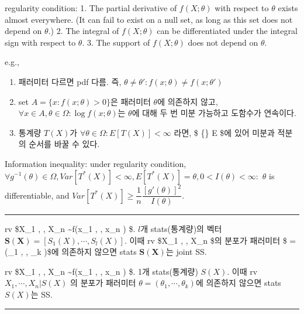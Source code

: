 \documentclass[
]{book}
\providecommand{\tightlist}{%
  \setlength{\itemsep}{0pt}\setlength{\parskip}{0pt}}
\begin{document}
regularity condition:
1. The partial derivative of \(f(X; \theta)\) with respect to \(\theta\) exists almost everywhere. (It can fail to exist on a null set, as long as this set does not depend on \(\theta\).)
2. The integral of \(f(X; \theta)\) can be differentiated under the integral sign with respect to \(\theta\).
3. The support of \(f(X; \theta)\) does not depend on \(\theta\).

e.g.,

\begin{enumerate}
\def\labelenumi{\arabic{enumi}.}
\tightlist
\item
  패러미터 다르면 pdf 다름. 즉, \(\theta \not = \theta': f(x;\theta) \not = f(x;\theta')\)
\item
  set \(A = \{ x: f(x;\theta)>0 \}\)은 패러미터 \(\theta\)에 의존하지 않고, \(\forall x \in A, \theta \in \Omega : \log f(x;\theta)\)는 \(\theta\)에 대해 두 번 미분 가능하고 도함수가 연속이다.
\item
  통계량 \(T(X)\)가 \(\forall \theta \in \Omega: E \left [ T (X) \right] < \infty\) 라면, \$ \dfrac {\partial} \{\partial \theta\} E \left [ T (X) \right]  \$에 있어 미분과 적분의 순서를 바꿀 수 있다.
\end{enumerate}

Information inequality:
under regularity condition, \(\forall g^{-1}(\theta) \in \Omega, Var \left [ T^\ast (X) \right] < \infty, E \left [ T^\ast (X) \right] = \theta, 0<I(\theta)< \infty:\) \(\theta\) is differentiable, and \(Var \left [ T^\ast (X) \right] \ge \dfrac {1}{n} \dfrac {\left[ g'(\theta) \right]^2}{I (\theta)}\).

\begin{center}\rule{0.5\linewidth}{0.5pt}\end{center}

rv \$X\_1 , \cdots, X\_n \sim f(x\_1 , \cdots, x\_n \rvert \theta) \$. \(l\)개 stats(통계량)의 벡터 \(\pmb {S(X)} = \left[ S_1(X), \cdots, S_l(X) \right]\).
이때 rv \$X\_1 , \cdots, X\_n \rvert {} \$의 분포가 패러미터 \$ \theta = (\theta\_1 , \cdots, \theta\_k )\$에 의존하지 않으면 stats \(\pmb {S(X)}\)는 joint SS.

rv \$X\_1 , \cdots, X\_n \sim f(x\_1 , \cdots, x\_n \rvert \theta) \$. 1개 stats(통계량) \(S(X)\).
이때 rv \(X_1 , \cdots, X_n \rvert S(X)\) 의 분포가 패러미터 \(\theta = (\theta_1 , \cdots, \theta_k )\)에 의존하지 않으면 stats \(S(X)\)는 SS.

\begin{center}\rule{0.5\linewidth}{0.5pt}\end{center}
\end{document}
